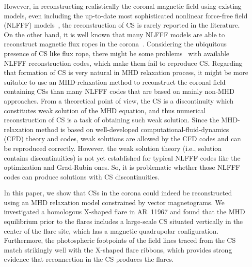\documentclass[twocolumn]{aastex6} %
\begin{document}
\begin{CJK*}{UTF8}{gbsn}
However, in reconstructing realistically the coronal magnetic field using existing models, even
including the up-to-date most sophisticated nonlinear force-free field (NLFFF)
models~\citep[e.g.,][]{DeRosa2009, Wiegelmann2012solar},
the reconstruction of CS is rarely reported in the literature.
On the other hand, it is well known that many NLFFF models are able to reconstruct
magnetic flux ropes in the corona~\citep{GuoY2017, ChengX2017}.
Considering the ubiquitous presence of CS like flux rope, there might be some problems~\citep[for example, see][]{Low2013} with available NLFFF reconstruction codes, which make them fail to reproduce CS.
Regarding that formation of CS is very natural in MHD relaxation process,
it might be more suitable to use an MHD-relaxation method to reconstruct
the coronal field containing CSs than many NLFFF codes that are based on mainly non-MHD approaches.
From a theoretical point of view, the CS is a discontinuity which constitutes weak solution of the MHD equation, and thus numerical reconstruction of CS is a task of obtaining such weak solution. Since the MHD-relaxation method is based on well-developed computational-fluid-dynamics (CFD) theory and codes, weak solutions are allowed by the CFD codes and can be reproduced correctly. However, the weak solution theory (i.e., solution contains discontinuities) is not yet established for typical NLFFF codes like the optimization and Grad-Rubin ones. So, it is problematic whether those NLFFF codes can produce solutions with CS discontinuities.



In this paper, we show that CSs in the corona could indeed be reconstructed
using an MHD relaxation model constrained by vector
magnetograms. We investigated a homologous X-shaped flare in AR~11967
and found that the MHD equilibrium prior to the flares includes a
large-scale CS situated vertically in the center of the flare site,
which has a magnetic quadrupolar configuration. Furthermore, the
photospheric footpoints of the field lines traced from the CS match
strikingly well with the X-shaped flare ribbons, which provides strong
evidence that reconnection in the CS produces the flares.


\end{CJK*}
\end{document}
